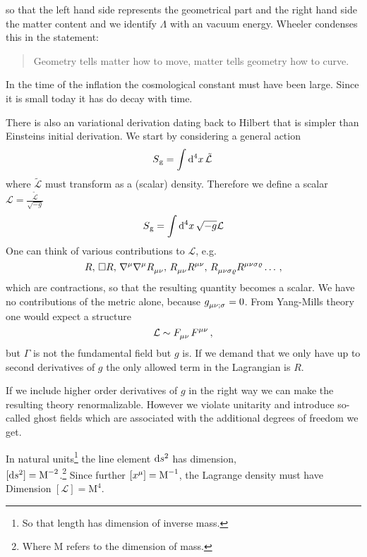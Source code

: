 so that the left hand side represents the geometrical part and the right hand
side the matter content and we identify $\Lambda$ with an vacuum energy.
Wheeler condenses this in the statement:
\begin{quote}
Geometry tells matter how to move, matter tells geometry how to
curve.
\end{quote}
\begin{sidenote}
In the time of the inflation the cosmological constant must have been large.
Since it is small today it has do decay with time.
\end{sidenote}
There is also an variational derivation dating back to Hilbert that is
simpler than Einsteins initial derivation. We start by considering a general action
\begin{equation}
S\textsubscript{g}=\fourint  \tilde{\mathcal{L}}\, 
\end{equation}
where $\tilde{\mathcal{L}}$ must transform as a (scalar) density. Therefore we
define a scalar $\mathcal{L}=\frac{\tilde{\mathcal{L}}}{\sqrt{-g}}$
\begin{equation}
S\textsubscript{g}=\fourint \sqrt{-g}\mathcal{L}
\end{equation}
One can think of various contributions to $\mathcal{L}$, e.g.
\begin{equation*}
R,\, \square
R,\,\tensor{\nabla}{^\mu}\tensor{\nabla}{^\mu}\tensor{R}{_\mu_\nu},\,
\tensor{R}{_\mu_\nu}\tensor{R}{^\mu^\nu}
,\,\tensor{R}{_\mu_\nu_\sigma_\varrho}\tensor{R}{^\mu^\nu^\sigma^\varrho}\dots\,,
\end{equation*}
which are contractions, so that the resulting quantity becomes a scalar.
We have no contributions of the metric alone, because
$\tensor{g}{_\mu_\nu_{;\sigma}}=0$. From Yang-Mills theory one would expect a
structure
\begin{equation}
\mathcal{L}\sim\tensor{F}{_\mu_\nu}\tensor{F}{^\mu^\nu}\,,
\end{equation}
but $\Gamma$ is not the fundamental field but $g$ is. If we demand that we only
have up to second derivatives of $g$ the only allowed term in the Lagrangian is
$R$.
\begin{sidenote}
If we include higher order derivatives of $g$ in the right way we can make the
resulting theory renormalizable. However we violate unitarity and introduce
so-called ghost fields which are associated with the additional degrees of freedom we get.
\end{sidenote}
\begin{remark}[Dimensions]
In natural units\footnote{So that length has dimension of inverse mass.} the
line element $\dif s^2$ has dimension, \\${[\dif
s^2]=\textrm{M}^{-2}}$.\footnote{Where M refers to the dimension of mass.} 
Since further ${\left[\tensor{x}{^\mu}\right]=\textrm{M}^{-1}}$,
the Lagrange density must have Dimension
${\left[\mathcal{L}\right]=\textrm{M}^{4}}$.
\end{remark}
